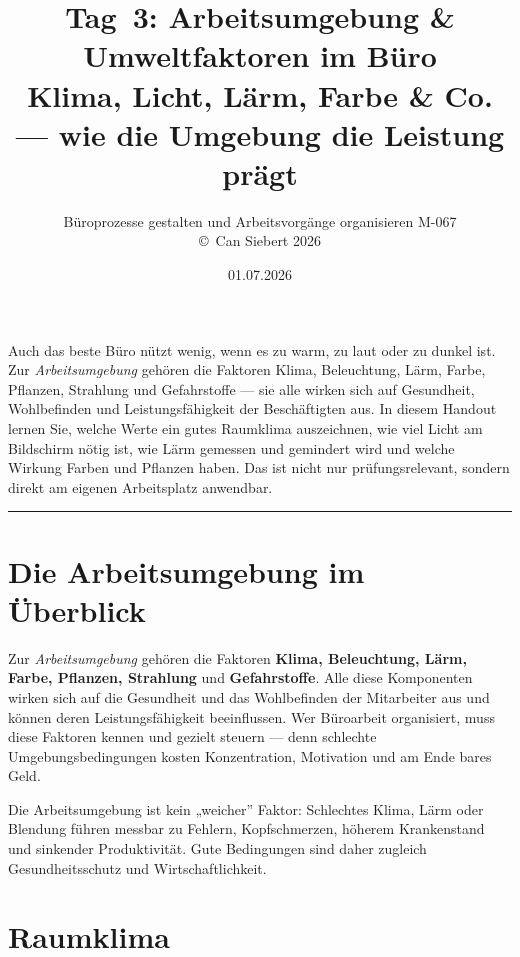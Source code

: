 \documentclass[11pt, a4paper]{article}
\title{\vspace*{-1.5cm}\Huge\bfseries\color{bfwPrimaryDark}Tag~3: Arbeitsumgebung \& Umweltfaktoren im Büro\\[0.4em]
  \large\color{bfwInkSoft}\textnormal{Klima, Licht, Lärm, Farbe \& Co. --- wie die Umgebung die Leistung prägt}}
\author{\textsf{Büroprozesse gestalten und Arbeitsvorgänge organisieren \textperiodcentered{} M-067}\\
\textsf{\small\copyright\ Can Siebert\,\textperiodcentered\,2026}}
\date{01.07.2026}
\begin{document}
\maketitle
\thispagestyle{empty}

\vspace{1em}
\begin{merksatz}[title={\bfseries Worum geht es heute?}]
Auch das beste Büro nützt wenig, wenn es zu warm, zu laut oder zu dunkel ist. Zur
\emph{Arbeitsumgebung} gehören die Faktoren Klima, Beleuchtung, Lärm, Farbe, Pflanzen,
Strahlung und Gefahrstoffe --- sie alle wirken sich auf Gesundheit, Wohlbefinden und
Leistungsfähigkeit der Beschäftigten aus. In diesem Handout lernen Sie, welche Werte ein
gutes Raumklima auszeichnen, wie viel Licht am Bildschirm nötig ist, wie Lärm gemessen
und gemindert wird und welche Wirkung Farben und Pflanzen haben. Das ist nicht nur
prüfungsrelevant, sondern direkt am eigenen Arbeitsplatz anwendbar.
\end{merksatz}

\tableofcontents
\vspace{1em}
\hrule
\vspace{1em}

\section{Die Arbeitsumgebung im Überblick}

Zur \emph{Arbeitsumgebung} gehören die Faktoren \textbf{Klima, Beleuchtung, Lärm, Farbe,
Pflanzen, Strahlung} und \textbf{Gefahrstoffe}. Alle diese Komponenten wirken sich auf
die Gesundheit und das Wohlbefinden der Mitarbeiter aus und können deren
Leistungsfähigkeit beeinflussen. Wer Büroarbeit organisiert, muss diese Faktoren kennen
und gezielt steuern --- denn schlechte Umgebungsbedingungen kosten Konzentration,
Motivation und am Ende bares Geld.

\begin{merksatz}
Die Arbeitsumgebung ist kein „weicher” Faktor: Schlechtes Klima, Lärm oder Blendung
führen messbar zu Fehlern, Kopfschmerzen, höherem Krankenstand und sinkender
Produktivität. Gute Bedingungen sind daher zugleich Gesundheitsschutz und
Wirtschaftlichkeit.
\end{merksatz}

\section{Raumklima}
\end{document}
